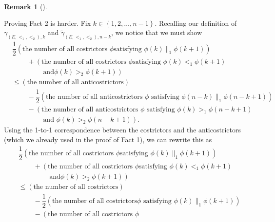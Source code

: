 \documentclass[numbers=enddot,12pt,final,onecolumn,notitlepage,abstracton]{scrartcl}
\theoremstyle{definition}
\newtheorem{remk}[theo]{Remark}
\newenvironment{remark}[1][]
{\begin{remk}[#1]\begin{leftbar}}
{\end{leftbar}\end{remk}}
\newenvironment{verlong}{}{}
\begin{document}
\begin{remark}
\begin{verlong}
Proving Fact 2 is harder. Fix $k\in\left\{  1,2,\ldots,n-1\right\}  $.
Recalling our definition of $\gamma_{\left(  E,<_{1},<_{2}\right)  ,k}$ and
$\widetilde{\gamma}_{\left(  E,<_{1},<_{2}\right)  ,n-k}$, we notice that we
must show%
\begin{align*}
& \dfrac{1}{2}\left(  \text{the number of all costrictors }\phi\text{
satisfying }\phi\left(  k\right)  \parallel_{1}\phi\left(  k+1\right)
\right)  \\
& \ \ \ \ \ \ \ \ \ \ +\left(  \text{the number of all costrictors }\phi\text{
satisfying }\phi\left(  k\right)  <_{1}\phi\left(  k+1\right)  \right. \\
& \ \ \ \ \ \ \ \ \ \ \qquad \left. \text{ and
}\phi\left(  k\right)  >_{2}\phi\left(  k+1\right)  \right)  \\
& \leq\left(  \text{the number of all anticostrictors}\right)  \\
& \ \ \ \ \ \ \ \ \ \ -\dfrac{1}{2}\left(  \text{the number of all
anticostrictors }\phi\text{ satisfying }\phi\left(  n-k\right)  \parallel
_{1}\phi\left(  n-k+1\right)  \right)  \\
& \ \ \ \ \ \ \ \ \ \ -\left(  \text{the number of all anticostrictors }%
\phi\text{ satisfying }\phi\left(  k\right)  >_{1}\phi\left(  n-k+1\right)
\right. \\
& \ \ \ \ \ \ \ \ \ \ \qquad \left.
\text{ and }\phi\left(  k\right)  >_{2}\phi\left(  n-k+1\right)  \right)  .
\end{align*}
Using the 1-to-1 correspondence between the costrictors and the
anticostrictors (which we already used in the proof of Fact 1), we can rewrite
this as%
\begin{align*}
& \dfrac{1}{2}\left(  \text{the number of all costrictors }\phi\text{
satisfying }\phi\left(  k\right)  \parallel_{1}\phi\left(  k+1\right)
\right)  \\
& \ \ \ \ \ \ \ \ \ \ +\left(  \text{the number of all costrictors }\phi\text{
satisfying }\phi\left(  k\right)  <_{1}\phi\left(  k+1\right) \right. \\
& \ \ \ \ \ \ \ \ \ \ \qquad \left. \text{ and
}\phi\left(  k\right)  >_{2}\phi\left(  k+1\right)  \right)  \\
& \leq\left(  \text{the number of all costrictors}\right)  \\
& \ \ \ \ \ \ \ \ \ \ -\dfrac{1}{2}\left(  \text{the number of all costrictors
}\phi\text{ satisfying }\phi\left(  k\right)  \parallel_{1}\phi\left(
k+1\right)  \right)  \\
& \ \ \ \ \ \ \ \ \ \ -\left(  \text{the number of all costrictors }\phi\text{
}
\end{align*}
\end{verlong}
\end{remark}
\end{document}
